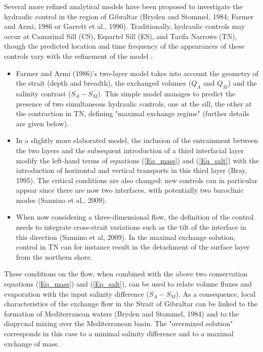\documentclass[a4paper,12pt]{article}
\begin{document}
Several more refined analytical models have been proposed to investigate the hydraulic control in the region of Gibraltar (Bryden and Stommel, 1984; Farmer and Armi, 1986 or Garrett et al., 1990). 
Traditionally, hydraulic controls may occur at Camarinal Sill (CS), Espartel Sill (ES), and Tarifa Narrows (TN), though the predicted location and time frequency of the appearances of these controls vary with the refinement of the model :
\begin{itemize}
\item{Farmer and Armi (1986)'s two-layer model takes into account the geometry of the strait (depth and breadth), the exchanged volumes ($Q_A$ and $Q_M$) and the salinity contrast ($S_A -S_M$). This simple model manages to predict the presence of two simultaneous hydraulic controls, one at the sill, the other at the contraction in TN, defining "maximal exchange regime"  (further details are given below). }

\item{In a slightly more elaborated model, the inclusion of the entrainment between the two layers and the subsequent introduction of a third interfacial layer modify the left-hand terms of equations (\ref{Eq_mass}) and (\ref{Eq_salt}) with the introduction of horizontal and vertical transports in this third layer (Bray, 1995). The critical conditions are also changed: new controls can in particular appear since there are now two interfaces, with potentially two baroclinic modes (Sannino et al., 2009).}

\item{ When now considering a three-dimensional flow, the definition of the control needs to integrate cross-strait variations such as the tilt of the interface in this direction (Sannino et al, 2009). In the maximal exchange solution, control in TN can for instance result in the detachment of the surface layer from the northern shore.}
\end{itemize}

These conditions on the flow, when combined with the above two conservation equations (\ref{Eq_mass}) and (\ref{Eq_salt}), can be used to relate volume fluxes and evaporation with the input salinity difference ($S_A-S_M$). As a consequence, local characteristics of the exchange flow in the Strait of Gibraltar can be linked to the formation of Mediterranean waters (Bryden and Stommel, 1984) and to the diapycnal mixing over the Mediterranean basin. The "overmixed solution" corresponds in this case to a minimal salinity difference and to a maximal exchange of mass.
\end{document}
